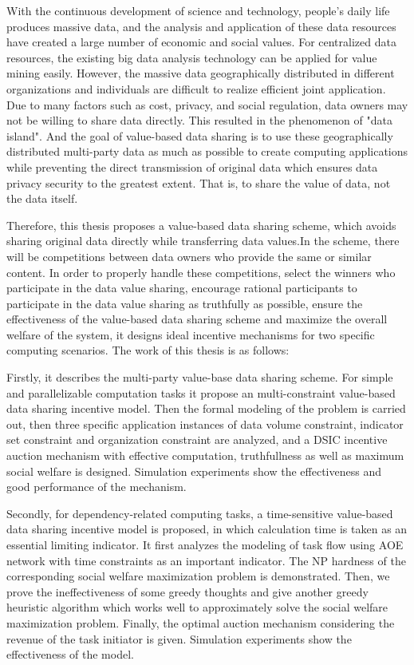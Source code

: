 \documentclass[promaster]{thesis-uestc}
\begin{document}
\begin{englishabstract}
With the continuous development of science and technology, people's daily life produces massive data, and the analysis and application of these data resources have created a large number of economic and social values. For centralized data resources, the existing big data analysis technology can be applied for value mining easily. However, the massive data geographically distributed in different organizations and individuals are difficult to realize efficient joint application.  Due to many factors such as cost, privacy, and social regulation, data owners may not be willing to share data directly.  This resulted in the phenomenon of "data island". And the goal of value-based data sharing is to use these geographically distributed multi-party data as much as possible to create computing applications while preventing the direct transmission of original data which ensures data privacy security to the greatest extent. That is, to share the value of data, not the data itself.

Therefore, this thesis proposes a value-based data sharing scheme, which avoids sharing original data directly while transferring data values.In the scheme, there will be competitions between data owners who provide the same or similar content. In order to properly handle these competitions, select the winners who participate in the data value sharing, encourage rational participants to participate in the data value sharing as truthfully as possible, ensure the effectiveness of the value-based data sharing scheme and maximize the overall welfare of the system, it designs ideal incentive mechanisms for two specific computing scenarios. The work of this thesis is as follows:

Firstly, it describes the multi-party value-base data sharing scheme.  For simple and parallelizable computation tasks it propose an multi-constraint value-based data sharing incentive model. Then the formal modeling of the problem is carried out, then three specific application instances of data volume constraint, indicator set constraint and organization constraint are analyzed, and a DSIC incentive auction mechanism with effective computation, truthfullness as well as maximum social welfare is designed.  Simulation experiments show the effectiveness and good performance of the mechanism.

Secondly, for dependency-related computing tasks, a time-sensitive value-based data sharing incentive model is proposed, in which calculation time is taken as an essential limiting indicator. It first analyzes the modeling of task flow using AOE network with time constraints as an important indicator.  The NP hardness of the corresponding social welfare maximization problem is demonstrated.  Then, we prove the ineffectiveness of some greedy thoughts and give another greedy heuristic algorithm which works well to approximately solve the social welfare maximization problem.  Finally, the optimal auction mechanism considering the revenue of the task initiator is given.  Simulation experiments show the effectiveness of the model.


\end{englishabstract}
\end{document}
